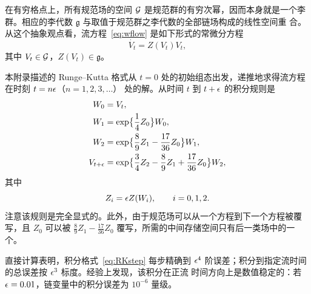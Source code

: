 在有穷格点上，所有规范场的空间 ${\cal G}$ 是规范群的有穷次幂，因而本身就是一个李
群。相应的李代数 $\mathfrak{g}$ 与取值于规范群之李代数的全部链场构成的线性空间重
合。从这个抽象观点看，流方程~\eqref{eq:wflow} 是如下形式的常微分方程
\begin{equation}
   \dot{V_t}=Z(V_t)V_t,
   \label{eq:flowODE}
\end{equation}
其中 $V_t\in{\cal G}$，$Z(V_t)\in\mathfrak{g}$。

本附录描述的 Runge--Kutta 格式从 $t=0$
处的初始组态出发，递推地求得流方程在时刻 $t=n\epsilon$（$n=1,2,3,\ldots$）
处的解。从时间 $t$ 到 $t+\epsilon$ 的积分规则是
\begin{align}
  W_0&=V_t,
  \nonumber\\
  W_1&=\exp\bigl\{\frac{1}{4}Z_0\bigr\}W_0,
  \nonumber\\
  W_2&=\exp\bigl\{\frac{8}{9}Z_1-\frac{17}{36}Z_0\bigr\}W_1,
  \nonumber\\
  V_{t+\epsilon}&=\exp\bigl\{\frac{3}{4}Z_2
                        -\frac{8}{9}Z_1+\frac{17}{36}Z_0\bigr\}W_2,
  \label{eq:RKstep}
\end{align}
其中
\begin{equation}
  Z_i=\epsilon Z(W_i),\qquad i=0,1,2.
\end{equation}
注意该规则是完全显式的。此外，由于规范场可以从一个方程到下一个方程被覆写，且
$Z_0$ 可以被 $\frac{8}{9}Z_1-\frac{17}{36}Z_0$
覆写，所需的中间存储空间只有后一类场中的一个。

直接计算表明，积分格式~\eqref{eq:RKstep} 每步精确到 $\epsilon^4$
阶误差；积分到指定流时间的总误差按 $\epsilon^3$ 标度。经验上发现，该积分在正流
时间方向上是数值稳定的：若 $\epsilon=0.01$，链变量中的积分误差为 $10^{-6}$ 量级。



